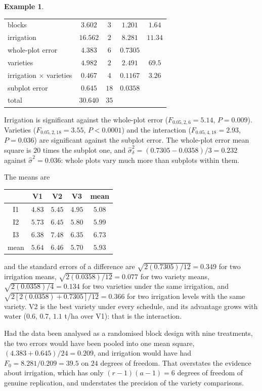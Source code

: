 \documentclass[11pt,a4paper]{article}
\numberwithin{equation}{section}
\theoremstyle{definition}
\newtheorem{exa}[thm]{Example}
\begin{document}
\begin{exa}
\begin{center}
\begin{tabular}{l|cccc}
\hline
blocks & $3.602$ & $3$ & $1.201$ & $1.64$ \\
irrigation & $16.562$ & $2$ & $8.281$ & $11.34$ \\
whole-plot error & $4.383$ & $6$ & $0.7305$ & \\
\hline
varieties & $4.982$ & $2$ & $2.491$ & $69.5$ \\
irrigation $\times$ varieties & $0.467$ & $4$ & $0.1167$ & $3.26$ \\
subplot error & $0.645$ & $18$ & $0.0358$ & \\
\hline
total & $30.640$ & $35$ & &
\end{tabular}
\end{center}
Irrigation is significant against the whole-plot error ($F_{0.05, 2, 6} = 5.14$, $P = 0.009$). Varieties ($F_{0.05, 2, 18} = 3.55$, $P < 0.0001$) and the interaction ($F_{0.05, 4, 18} = 2.93$, $P = 0.036$) are
significant against the subplot error. The whole-plot error mean square is $20$ times the subplot one, and $\hat\sigma^2_\delta = (0.7305 - 0.0358)/3 = 0.232$ against $\hat\sigma^2 = 0.036$:
whole plots vary much more than subplots within them.

The means are
\begin{center}
\begin{tabular}{c|ccc|c}
& V1 & V2 & V3 & mean \\
\hline
I1 & $4.83$ & $5.45$ & $4.95$ & $5.08$ \\
I2 & $5.73$ & $6.45$ & $5.80$ & $5.99$ \\
I3 & $6.38$ & $7.48$ & $6.35$ & $6.73$ \\
\hline
mean & $5.64$ & $6.46$ & $5.70$ & $5.93$
\end{tabular}
\end{center}
and the standard errors of a difference are $\sqrt{2(0.7305)/12} = 0.349$ for two irrigation means, $\sqrt{2(0.0358)/12} = 0.077$ for two variety means, $\sqrt{2(0.0358)/4} = 0.134$ for
two varieties under the same irrigation, and $\sqrt{2[2(0.0358) + 0.7305]/12} = 0.366$ for two irrigation levels with the same variety. V2 is the best variety under every
schedule, and its advantage grows with water ($0.6$, $0.7$, $1.1$ t/ha over V1): that is the interaction.

Had the data been analysed as a randomised block design with nine treatments, the two errors would have been pooled into one mean square,
$(4.383 + 0.645)/24 = 0.209$, and irrigation would have had $F_0 = 8.281/0.209 = 39.5$ on $24$ degrees of freedom. That overstates the evidence about irrigation, which has
only $(r - 1)(a - 1) = 6$ degrees of freedom of genuine replication, and understates the precision of the variety comparisons.
\end{exa}
\end{document}
